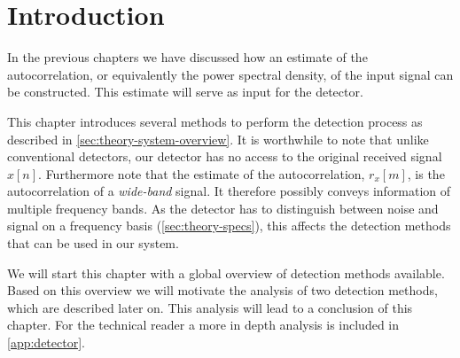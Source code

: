 \documentclass[a4paper, openany, oneside]{memoir}
\begin{document}
\section{Introduction}
In the previous chapters we have discussed how an estimate of the autocorrelation, or equivalently the power spectral density, of the input signal can be constructed. This estimate will serve
as input for the detector.

This chapter introduces several methods to perform the detection process as described in \cref{sec:theory-system-overview}. It is worthwhile to note that unlike conventional detectors, our detector has no access to the original received signal $x[n]$. Furthermore note that the estimate of the autocorrelation, $r_x[m]$, is the autocorrelation of a \emph{wide-band} signal. It therefore possibly conveys information of multiple frequency bands. As the detector has to distinguish between noise and signal on a frequency basis (\cref{sec:theory-specs}), this affects the detection methods that can be used in our system.  

We will start this chapter with a global overview of detection methods available. Based on this overview we will motivate the analysis of two detection methods, which are described later on. This analysis will lead to a conclusion of this chapter. For the technical reader a more in depth analysis is included in \cref{app:detector}.
\end{document}
